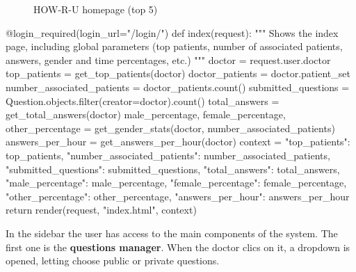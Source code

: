 \documentclass[12pt,english]{article}
\begin{document}
\begin{figure}[H]
    \caption{HOW-R-U homepage (top 5)}
\end{figure}
\newpage
\begin{python}[caption={Method to show the main homepage components}, captionpos=b]
  @login_required(login_url="/login/")
  def index(request):
      """
      Shows the index page, including global parameters (top patients, number of associated patients, answers, gender and time percentages, etc.)
      """
      doctor = request.user.doctor
      top_patients = get_top_patients(doctor)
      doctor_patients = doctor.patient_set
      number_associated_patients = doctor_patients.count()
      submitted_questions = Question.objects.filter(creator=doctor).count()
      total_answers = get_total_answers(doctor)
      male_percentage, female_percentage, other_percentage = get_gender_stats(doctor, number_associated_patients)
      answers_per_hour = get_answers_per_hour(doctor)
      context = {
          "top_patients": top_patients,
          "number_associated_patients": number_associated_patients,
          "submitted_questions": submitted_questions,
          "total_answers": total_answers,
          "male_percentage": male_percentage,
          "female_percentage": female_percentage,
          "other_percentage": other_percentage,
          "answers_per_hour": answers_per_hour
      }
      return render(request, "index.html", context)
\end{python}

In the sidebar the user has access to the main components of the system. The first one is the \textbf{questions manager}. When the doctor clics on it, a dropdown is opened, letting choose public or private questions.
\end{document}
